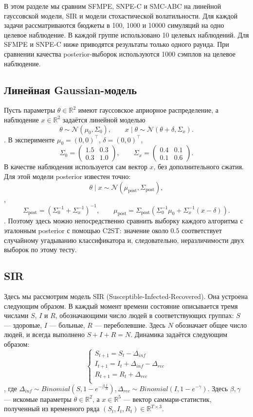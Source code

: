 В этом разделе мы сравним SFMPE, SNPE-C и SMC-ABC на линейной гауссовской
модели, SIR и модели стохастической волатильности. Для каждой задачи
рассматриваются бюджеты в 100, 1000 и 10000 симуляций на одно целевое
наблюдение. В каждой группе использовано 10 целевых наблюдений.
Для SFMPE и SNPE-C ниже приводятся результаты только одного раунда.
При сравнении качества posterior-выборок используются 1000 сэмплов на целевое наблюдение.

\subsection{Линейная Gaussian-модель}

Пусть параметры $\theta\in\mathbb{R}^2$ имеют гауссовское априорное
распределение, а наблюдение $x\in\mathbb{R}^2$ задаётся линейной моделью
\[
\theta \sim \mathcal{N}(\mu_0,\Sigma_0), \qquad
x\mid\theta \sim \mathcal{N}(\theta+\delta,\Sigma_x).
\].
В эксперименте $\mu_0=(0,0)^\top$, $\delta=(0,0)^\top$,
\[
\Sigma_0 =
\begin{pmatrix}
1.5 & 0.3\\
0.3 & 1.0
\end{pmatrix},
\qquad
\Sigma_x =
\begin{pmatrix}
0.4 & 0.1\\
0.1 & 0.6
\end{pmatrix}.
\]
В качестве наблюдения используется сам вектор $x$, без дополнительного
сжатия. Для этой модели posterior известен точно:
\[
\theta\mid x \sim \mathcal{N}(\mu_{\mathrm{post}},\Sigma_{\mathrm{post}}),
\],
\[
\Sigma_{\mathrm{post}}
=\left(\Sigma_0^{-1}+\Sigma_x^{-1}\right)^{-1},
\qquad
\mu_{\mathrm{post}}
=\Sigma_{\mathrm{post}}\left(
\Sigma_0^{-1}\mu_0+\Sigma_x^{-1}(x-\delta)
\right).
\].
Поэтому здесь можно непосредственно сравнить выборку каждого алгоритма с
эталонным posterior с помощью C2ST: значение около $0.5$ соответствует
случайному угадыванию классификатора и, следовательно, неразличимости
двух выборок по этому тесту.

\subsection{SIR}
\hfill \break
\hfill \break
Здесь мы рассмотрим модель SIR (Susceptible-Infected-Recovered).
Она устроена следующим образом. В каждый момент времени состояние описывается
тремя числами $S$, $I$ и $R$, обозначающими число людей в соответствующих группах:
$S$ --- здоровые, $I$ --- больные, $R$ --- переболевшие.
Здесь $N$ обозначает общее число людей, и всегда выполнено $S + I + R = N$.
Динамика задаётся следующим образом:
\[
\begin{cases}
S_{t+1} = S_t - \Delta_{inf} \\
I_{t+1} = I_t + \Delta_{inf} - \Delta_{rec} \\
R_{t+1} = R_t + \Delta_{rec} \\
\end{cases}
\],
где $\Delta_{inf} \sim Binomial(S, 1 - e^{-\beta \frac{I}{N}}), \Delta_{rec} \sim Binomial(I, 1 - e^{-\gamma})$. 
Здесь $\beta, \gamma$ --- искомые параметры $\theta \in \mathbb{R}^2$, а $x \in \mathbb{R}^5$ --- вектор саммари-статистик, 
полученный из временного ряда $(S_t, I_t, R_t) \in \mathbb{R}^{T \times 3}$.


